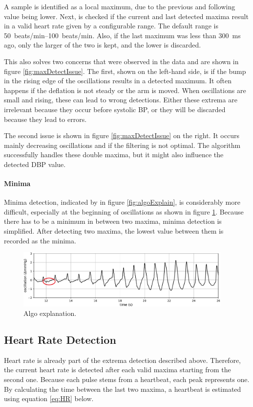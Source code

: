 A sample is identified as a local maximum, due to the previous and following value being lower. Next, is checked if the current and last detected maxima result in a valid heart rate given by a configurable range. The default range is \SIrange{50}{100}{beats/\minute}. Also, if the last maximum was less than \SI{300}{\milli\second} ago, only the larger of the two is kept, and the lower is discarded.

This also solves two concerns that were observed in the data and are shown in figure \ref{fig:maxDetectIssue}. The first, shown on the left-hand side, is if the bump in the rising edge of the oscillations results in a detected maximum. It often happens if the deflation is not steady or the arm is moved. When oscillations are small and rising, these can lead to wrong detections. Either these extrema are irrelevant because they occur before systolic BP, or they will be discarded because they lead to errors.

The second issue is shown in figure \ref{fig:maxDetectIssue} on the right. It occurs mainly decreasing oscillations and if the filtering is not optimal. The algorithm successfully handles these double maxima, but it might also influence the detected DBP value. 

\paragraph{Minima} Minima detection, indicated by  in figure \ref{fig:algoExplain}, is considerably more difficult, especially at the beginning of oscillations as shown in figure \ref{fig:oscMini}. Because there has to be a minimum in between two maxima, minima detection is simplified. After detecting two maxima, the lowest value between them is recorded as the minima.

\begin{figure}[ht]
\centering
\includegraphics[width=0.95\textwidth]{figures/minima_issue.pdf}
\caption{Algo explanation.}
\label{fig:oscMini}
\end{figure}

\subsection{Heart Rate Detection}\label{sec:HR}
Heart rate is already part of the extrema detection described above. Therefore, the current heart rate is detected after each valid maxima starting from the second one. Because each pulse stems from a heartbeat, each peak represents one. By calculating the time between the last two maxima, a heartbeat is estimated using equation \ref{eq:HR} below.


